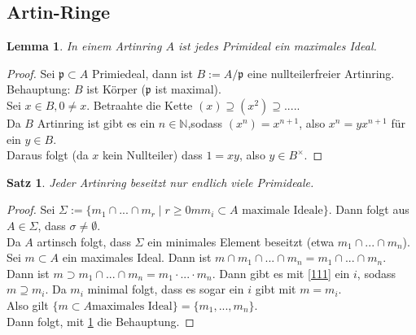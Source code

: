 \documentclass[10pt,a4paper]{article}
\newcommand{\N}{\ensuremath{\mathbb{N}}}
\newcounter{thm}[section]
\theoremstyle{definition}
\theoremstyle{plain}
\newtheorem{lem}[thm]{Lemma}
\newtheorem{satz}[thm]{Satz}
\theoremstyle{remark}
\begin{document}
\subsection{Artin-Ringe}
\begin{lem}\label{523lem}
	In einem Artinring $A$ ist jedes Primideal ein maximales Ideal.
\end{lem}
\begin{proof}
	Sei $\mathfrak p\subset A$ Primiedeal, dann ist $B:=A/\mathfrak p$ eine nullteilerfreier Artinring.\\
	Behauptung: $B$ ist Körper ($\mathfrak p$ ist maximal).\\
	Sei $x\in B,0\neq x$. Betraahte die Kette $(x)\supseteq(x^2)\supseteq....$.\\
	Da $B$ Artinring ist gibt es ein $n\in\N$,sodass $(x^n)=x^{n+1}$, also $x^n=yx^{n+1}$ für ein $y\in B$.\\
	Daraus folgt (da $x$ kein Nullteiler) dass $1=xy$, also $y\in B^\times$.
\end{proof}
\begin{satz}\label{524Satz}
	Jeder Artinring beseitzt nur endlich viele Primideale.
\end{satz}
\begin{proof}
	Sei $\Sigma:=\{m_1\cap...\cap m_r\mid r\ge 0mm_i\subset A\text{ maximale Ideale}\}$. Dann folgt aus $A\in\Sigma$, dass $\sigma\neq \emptyset$.\\
	Da $A$ artinsch folgt, dass $\Sigma$ ein minimales Element beseitzt (etwa $m_1\cap...\cap m_n$).\\
	Sei $m\subset A$ ein maximales Ideal. Dann ist $m\cap m_1\cap...\cap m_n=m_1\cap...\cap m_n$.\\
	Dann ist $m\supset m_1\cap...\cap m_n=m_1\cdot ...\cdot m_n$. Dann gibt es mit \ref{111} ein $i$, sodass $m\supseteq m_i$. Da $m_i$ minimal folgt, dass es sogar ein $i$ gibt mit $m=m_i$.\\
	Also gilt $\{m\subset A\text{maximales Ideal}\}=\{m_1,...,m_n\}$.\\
	Dann folgt, mit \ref{523lem} die Behauptung.
\end{proof}
\end{document}
